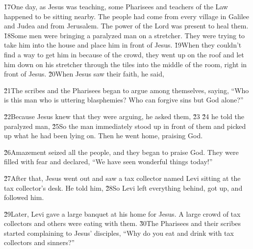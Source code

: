 \v{17}One day, as Jesus was teaching, some Pharisees and teachers of the Law happened to be sitting nearby. The people had come from every village in Galilee and Judea and from Jerusalem. The power of the Lord was present to heal them. \v{18}Some men were bringing a paralyzed man on a stretcher. They were trying to take him into the house and place him in front of Jesus. \v{19}When they couldn't find a way to get him in because of the crowd, they went up on the roof and let him down on his stretcher through the tiles into the middle of the room, right in front of Jesus. \v{20}When Jesus saw their faith, he said, 

\v{21}The scribes and the Pharisees began to argue among themselves, saying, ``Who is this man who is uttering blasphemies? Who can forgive sins but God alone?''

\v{22}Because Jesus knew that they were arguing, he asked them,  \v{23} \v{24} he told the paralyzed man,  \v{25}So the man immediately stood up in front of them and picked up what he had been lying on. Then he went home, praising God.

\v{26}Amazement seized all the people, and they began to praise God. They were filled with fear and declared, ``We have seen wonderful things today!''

\v{27}After that, Jesus went out and saw a tax collector named Levi sitting at the tax collector's desk. He told him,  \v{28}So Levi left everything behind, got up, and followed him.

\v{29}Later, Levi gave a large banquet at his home for Jesus. A large crowd of tax collectors and others were eating with them. \v{30}The Pharisees and their scribes started complaining to Jesus' disciples, ``Why do you eat and drink with tax collectors and sinners?''

